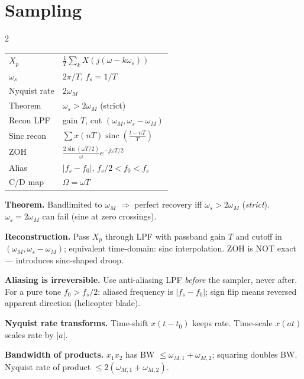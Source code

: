 \documentclass[11pt]{extarticle}
\DeclareMathOperator{\sinc}{sinc}
\newcommand{\pairsection}[4]{%
  \needspace{2.8in}%
  \columnratio{#1}%
  \section*{#2}%
  \begin{paracol}{2}%
  #3%
  \switchcolumn%
  #4%
  \end{paracol}%
  \par\vspace{4pt}}
\begin{document}
\pairsection{0.32}{Sampling}{%
\begin{tabular}{@{}l l@{}}
\toprule
$X_p$ & $\tfrac{1}{T}\!\sum_k X(j(\omega{-}k\omega_s))$ \\
$\omega_s$ & $2\pi/T$, $f_s{=}1/T$ \\
Nyquist rate & $2\omega_M$ \\
Theorem & $\omega_s{>}2\omega_M$ (strict) \\
Recon LPF & gain $T$, cut $(\omega_M,\omega_s{-}\omega_M)$ \\
Sinc recon & $\sum x(nT)\sinc(\tfrac{t{-}nT}{T})$ \\
ZOH & $\tfrac{2\sin(\omega T/2)}{\omega}e^{-j\omega T/2}$ \\
Alias & $|f_s{-}f_0|$, $f_s/2{<}f_0{<}f_s$ \\
C/D map & $\Omega{=}\omega T$ \\
\bottomrule
\end{tabular}%
}{%
\textbf{Theorem.} Bandlimited to $\omega_M$ $\Rightarrow$ perfect recovery iff $\omega_s>2\omega_M$ (\emph{strict}). $\omega_s=2\omega_M$ can fail (sine at zero crossings).

\textbf{Reconstruction.} Pass $X_p$ through LPF with passband gain $T$ and cutoff in $(\omega_M,\omega_s{-}\omega_M)$; equivalent time-domain: sinc interpolation. ZOH is NOT exact --- introduces sinc-shaped droop.

\textbf{Aliasing is irreversible.} Use anti-aliasing LPF \emph{before} the sampler, never after. For a pure tone $f_0>f_s/2$: aliased frequency is $|f_s-f_0|$; sign flip means reversed apparent direction (helicopter blade).

\textbf{Nyquist rate transforms.} Time-shift $x(t-t_0)$ keeps rate. Time-scale $x(at)$ scales rate by $|a|$.

\textbf{Bandwidth of products.} $x_1 x_2$ has BW $\le \omega_{M,1}+\omega_{M,2}$; squaring doubles BW. Nyquist rate of product $\le 2(\omega_{M,1}+\omega_{M,2})$.%
}
\end{document}
